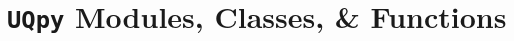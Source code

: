 \begin{figure}[!ht]
	\caption{}
	\label{template_output}
\end{figure}

%

\section{\texttt{UQpy} Modules, Classes, \& Functions}


